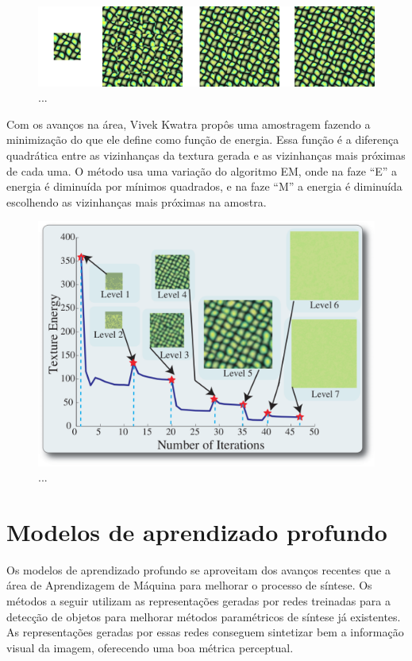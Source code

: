 \begin{figure}[!ht]
	\includegraphics[width=\linewidth]{files/assets/articles/efros2.png}
	\caption{...}
	\label{img:preview}
\end{figure}

Com os avanços na área,
Vivek Kwatra \cite{Kwatra2005} propôs
uma amostragem fazendo a minimização
do que ele define como função de energia. 
Essa função é a diferença quadrática
entre as vizinhanças da textura gerada
e as vizinhanças mais próximas de cada uma.
O método usa uma variação do algoritmo EM, 
onde na faze ``E'' a energia é diminuída
por mínimos quadrados, e na faze ``M'' a
energia é diminuída escolhendo as
vizinhanças mais próximas na amostra.

\begin{figure}[!ht]
	\centering
	\includegraphics[width=\linewidth*2/3]{files/assets/articles/kwatra.png}
	\caption{...}
	\label{img:preview}
\end{figure}


\section{Modelos de aprendizado profundo}

Os modelos de aprendizado profundo se aproveitam
dos avanços recentes que a área de Aprendizagem
de Máquina para melhorar o processo de síntese.
Os métodos a seguir utilizam as representações
geradas por redes treinadas para a detecção
de objetos para melhorar métodos paramétricos
de síntese já existentes.
As representações geradas por essas
redes conseguem sintetizar bem a informação
visual da imagem, oferecendo uma boa
métrica perceptual.

